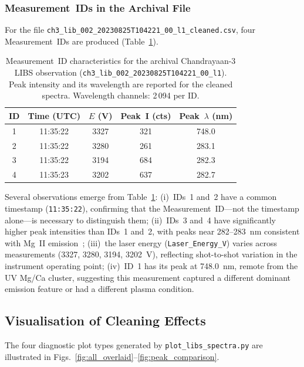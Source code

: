 \documentclass[a4paper,twocolumn,10pt]{article}
\begin{document}
\subsubsection{Measurement~IDs in the Archival File}

For the file \texttt{ch3\_lib\_002\_20230825T104221\_00\_l1\_cleaned.csv},
four Measurement~IDs are produced (Table~\ref{tab:measurement_ids}).

\begin{table}[!t]
\centering
\caption{Measurement~ID characteristics for the archival
  Chandrayaan-3 LIBS observation
  (\texttt{ch3\_lib\_002\_20230825T104221\_00\_l1}).
  Peak intensity and its wavelength are reported for the cleaned
  spectra.  Wavelength channels: 2\,094 per ID.}
\label{tab:measurement_ids}
\begin{tabularx}{\textwidth}{@{}ccccc@{}}
\toprule
\textbf{ID} & \textbf{Time (UTC)} & \textbf{$E$ (V)} & \textbf{Peak~I (cts)} & \textbf{Peak~$\lambda$ (nm)} \\
\midrule
1 & 11:35:22 & 3327 & 321  & 748.0 \\
2 & 11:35:22 & 3280 & 261  & 283.1 \\
3 & 11:35:22 & 3194 & 684  & 282.3 \\
4 & 11:35:23 & 3202 & 637  & 282.7 \\
\bottomrule
\end{tabularx}
\end{table}

Several observations emerge from Table~\ref{tab:measurement_ids}:
(i)~IDs~1 and~2 have a common timestamp (\texttt{11:35:22}),
confirming that the Measurement~ID---not the timestamp alone---is
necessary to distinguish them; (ii)~IDs~3 and~4 have significantly
higher peak intensities than IDs~1 and~2, with peaks near 282--283~nm
consistent with Mg~II emission~\cite{NIST}; (iii)~the laser energy
(\texttt{Laser\_Energy\_V}) varies across measurements (3327, 3280,
3194, 3202~V), reflecting shot-to-shot variation in the instrument
operating point; (iv)~ID~1 has its peak at 748.0~nm, remote from the
UV Mg/Ca cluster, suggesting this measurement captured a different
dominant emission feature or had a different plasma condition.

\subsection{Visualisation of Cleaning Effects}

The four diagnostic plot types generated by
\texttt{plot\_libs\_spectra.py} are illustrated in
Figs.~\ref{fig:all_overlaid}--\ref{fig:peak_comparison}.
\end{document}
